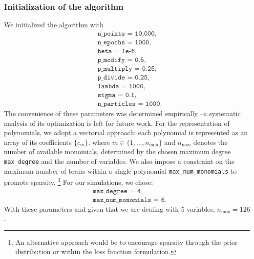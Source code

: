 \documentclass[11pt,a4paper]{article}
\newcommand{\gl}[1]{\marginpar{\parbox{\marginparwidth}{\boldmath $\Longleftarrow$}}{\boldmath\bfseries (gl: #1)}}
\begin{document}
	
	\subsubsection{Initialization of the algorithm}
	
	We initialized the algorithm with
	\begin{equation}	\label{eq:sample10000adaptativetemp}
		\begin{aligned}
			&\texttt{n\_points = 10,000},\\
			&\texttt{n\_epochs = 1000},\\
			&\texttt{beta  = 1e-6}, \\
			&\texttt{p\_{modify} = 0.5},\\
			&\texttt{p\_{multiply} = 0.25},\\
			&\texttt{p\_{divide} = 0.25},\\
			&\texttt{lambda = 1000},\\
			&\texttt{sigma = 0.1},\\
			&\texttt{n\_particles = 1000}.
		\end{aligned}
	\end{equation}
	The convenience of these parameters was determined empirically --a systematic analysis of its optimization is left for future work. For the representation of polynomials, we adopt a vectorial approach: each polynomial is represented as an array of its coefficients $\{c_m\}$, where $m \in \{1,\dots,n_{\text{mon}}\}$ and $n_{\text{mon}}$ denotes the number of available monomials, determined by the chosen maximum degree \texttt{max\_degree} and the number of variables. We also impose a constraint on the maximum number of terms within a single polynomial \texttt{max\_num\_monomials} to promote sparsity. \footnote{An alternative approach would be to encourage sparsity through the prior distribution or within the loss function formulation.} For our simulations, we chose:
	\begin{equation} \label{eq:parampol}
		\begin{aligned}
			&\texttt{max\_degree = 4},\\
			&\texttt{max\_num\_monomials = 6.}
		\end{aligned}
	\end{equation}
With these parameters and given that we are dealing with $5$ variables, $n_{\text{mon}} = 126$.
	
\end{document}
